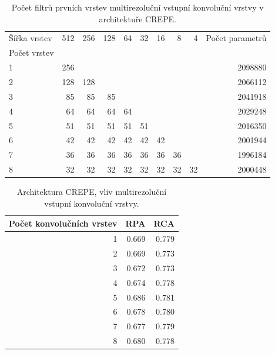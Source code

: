 \begin{table}[h!]
\centering
    \begin{tabular}{lrrrrrrrrr}
    \toprule
    Šířka vrstev & 512 & 256 & 128 & 64 & 32 & 16 & 8  & 4  & Počet parametrů  \\
    Počet vrstev & {} & {} & {} & {} & {} & {} & {}  & {}  & {}  \\
    \midrule
    1                   & 256 &     &     &    &    &    &    &    & 2098880 \\
    2                   & 128 & 128 &     &    &    &    &    &    & 2066112 \\
    3                   & 85  & 85  & 85  &    &    &    &    &    & 2041918 \\
    4                   & 64  & 64  & 64  & 64 &    &    &    &    & 2029248 \\
    5                   & 51  & 51  & 51  & 51 & 51 &    &    &    & 2016350 \\
    6                   & 42  & 42  & 42  & 42 & 42 & 42 &    &    & 2001944 \\
    7                   & 36  & 36  & 36  & 36 & 36 & 36 & 36 &    & 1996184 \\
    8                   & 32  & 32  & 32  & 32 & 32 & 32 & 32 & 32 & 2000448 \\
    \bottomrule
    \end{tabular}
\caption{Počet filtrů prvních vrstev multirezoluční vstupní konvoluční vrstvy v architektuře CREPE.}\label{tab:crepe_velikosti_multirozliseni}
\end{table}

\begin{table}[h!]
\centering
    \begin{tabular}{rrr}
    \toprule
    Počet konvolučních vrstev &   RPA &   RCA \\
    \midrule
                            1 & 0.669 & 0.779 \\
                            2 & 0.669 & 0.773 \\
                            3 & 0.672 & 0.773 \\
                            4 & 0.674 & 0.778 \\
                            5 & 0.686 & 0.781 \\
                            6 & 0.678 & 0.780 \\
                            7 & 0.677 & 0.779 \\
                            8 & 0.680 & 0.778 \\
    \bottomrule
    \end{tabular}
\caption{Architektura CREPE, vliv multirezoluční vstupní konvoluční vrstvy.}\label{tab:crepe_multirozliseni}
\end{table}

